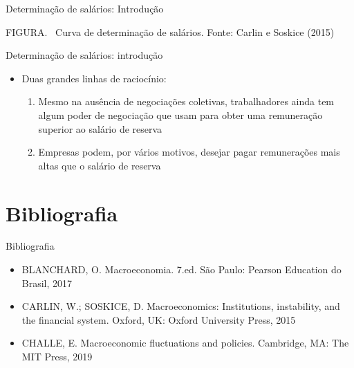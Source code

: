 \documentclass[10pt]{beamer}
\begin{document}
\begin{frame}{Determinação de salários: Introdução}
    \begin{center}
		\begin{minipage}[b]{.8\textwidth}
			\tiny{{\scshape FIGURA}. \ Curva de determinação de salários. Fonte: Carlin e Soskice (2015)} 
		\end{minipage}
	\end{center}
\end{frame}

\begin{frame}
    {Determinação de salários: introdução}
    \begin{itemize}
        \item Duas grandes linhas de raciocínio:\medskip
        \begin{enumerate}
            \item Mesmo na ausência de negociações coletivas, trabalhadores ainda tem algum poder de negociação que usam para obter uma remuneração superior ao salário de reserva\medskip
            \item Empresas podem, por vários motivos, desejar pagar remunerações mais altas que o salário de reserva
        \end{enumerate}
    \end{itemize}
\end{frame}
\section{Bibliografia}
\begin{frame}{ Bibliografia}
    \begin{itemize}                
        \item BLANCHARD, O. Macroeconomia. 7.ed. São Paulo: Pearson Education do Brasil, 2017\medskip                
        \item CARLIN, W.; SOSKICE, D. Macroeconomics: Institutions, instability, and the financial system. Oxford, UK: Oxford University Press, 2015\medskip
        \item CHALLE, E. Macroeconomic fluctuations and policies. Cambridge, MA: The MIT Press, 2019\medskip                
    \end{itemize}
\end{frame}
\end{document}
